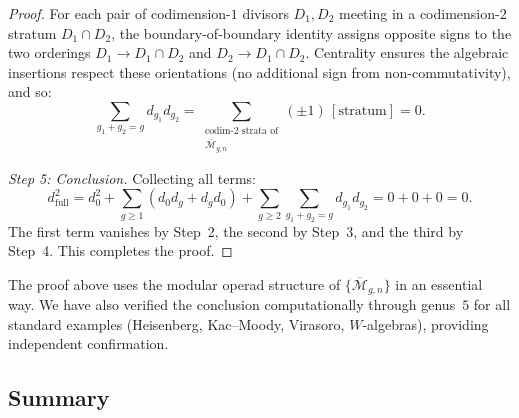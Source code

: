 \begin{proof}
For each pair of codimension-$1$ divisors $D_1, D_2$ meeting in a codimension-$2$
stratum $D_1 \cap D_2$, the boundary-of-boundary identity assigns opposite signs
to the two orderings $D_1 \to D_1 \cap D_2$ and $D_2 \to D_1 \cap D_2$.
Centrality ensures the algebraic insertions respect these orientations (no
additional sign from non-commutativity), and so:
\[
  \sum_{g_1 + g_2 = g} d_{g_1} d_{g_2}
  = \sum_{\substack{\text{codim-2 strata of}\\
      \overline{\mathcal{M}}_{g,n}}} (\pm 1)\, [\text{stratum}] = 0.
\]

\medskip
\emph{Step 5: Conclusion.}
Collecting all terms:
\[
  d_{\mathrm{full}}^2 = d_0^2
  + \sum_{g \geq 1} (d_0 d_g + d_g d_0)
  + \sum_{g \geq 2}\sum_{g_1 + g_2 = g} d_{g_1} d_{g_2}
  = 0 + 0 + 0 = 0.
\]
The first term vanishes by Step~2, the second by Step~3, and the third by Step~4.
This completes the proof.
\end{proof}

\begin{remark}\label{rem:genus-induction-status}
The proof above uses the modular operad structure of
$\{\overline{\mathcal{M}}_{g,n}\}$ in an essential way.  We have also verified
the conclusion computationally through genus~$5$ for all standard examples
(Heisenberg, Kac--Moody, Virasoro, $W$-algebras), providing independent
confirmation.
\end{remark}

\subsection{Summary}


